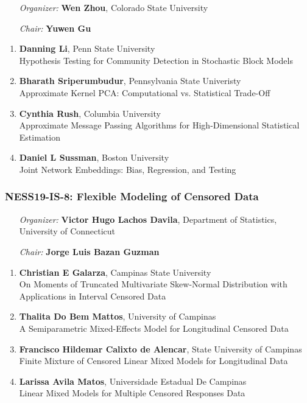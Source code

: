 \begin{enumerate}[align=left]
\item [\emph{Organizer:}] \textbf{Wen Zhou}, Colorado State University \\
\item [\emph{Chair:}] \textbf{Yuwen Gu}
\end{enumerate}

\begin{enumerate}
\item \textbf{Danning Li}, Penn State University \\
Hypothesis Testing for Community Detection in Stochastic Block Models
\item \textbf{Bharath Sriperumbudur}, Pennsylvania State Univeristy \\
Approximate Kernel PCA: Computational vs. Statistical Trade-Off
\item \textbf{Cynthia Rush}, Columbia University \\
Approximate Message Passing Algorithms for High-Dimensional Statistical Estimation
\item \textbf{Daniel L Sussman}, Boston University \\
Joint Network Embeddings: Bias, Regression, and Testing
\end{enumerate}

\subsubsection*{NESS19-IS-8: Flexible Modeling of Censored Data}

\begin{enumerate}[align=left]
\item [\emph{Organizer:}] \textbf{Victor Hugo Lachos Davila}, Department of Statistics, University of Connecticut \\
\item [\emph{Chair:}] \textbf{Jorge Luis Bazan Guzman}
\end{enumerate}

\begin{enumerate}
\item \textbf{Christian E Galarza}, Campinas State University \\
On Moments of Truncated Multivariate Skew-Normal Distribution with Applications in Interval Censored Data
\item \textbf{Thalita Do Bem Mattos}, University of Campinas \\
A Semiparametric Mixed-Effects Model for Longitudinal  Censored Data
\item \textbf{Francisco Hildemar Calixto de Alencar}, State University of Campinas \\
Finite Mixture of Censored Linear Mixed Models for Longitudinal Data
\item \textbf{Larissa Avila Matos}, Universidade Estadual De Campinas \\
Linear Mixed Models for Multiple Censored Responses Data
\end{enumerate}

